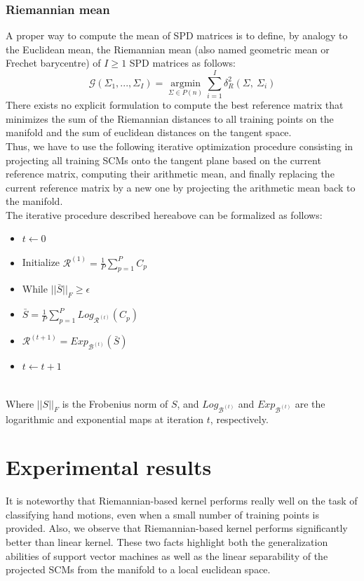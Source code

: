 \documentclass[a4paper,11pt]{report}
\begin{document}
\subsection{Riemannian mean}
A proper way to compute the mean of SPD matrices is to define, by analogy to the Euclidean mean, the Riemannian mean (also named geometric mean or Frechet barycentre) of $I \geq 1$ SPD matrices as follows:
$$\mathcal{G}\left(\Sigma_1, ..., \Sigma_I \right) = \mathop{\mathrm{argmin}}\limits_{\Sigma \in P(n)} \sum_{i=1}^I \delta_R^2 \left( \Sigma,\ \Sigma_i \right) $$
There exists no explicit formulation to compute the best reference matrix that minimizes the sum of the Riemannian distances to all training points on the manifold and the sum of euclidean distances on the tangent space.\\
Thus, we have to use the following iterative optimization procedure consisting in projecting all training SCMs onto the tangent plane based on the current reference matrix, computing their arithmetic mean, and finally replacing the current reference matrix by a new one by projecting the arithmetic mean back to the manifold.\\
The iterative procedure described hereabove can be formalized as follows:
\begin{itemize}
\item $t \leftarrow 0$
\item Initialize $\mathcal{R}^{(1)} = \frac{1}{P} \sum\limits_{p=1}^{P} C_p$
\item While $||\bar{S}||_F \ge \epsilon$
\item $\bar{S} = \frac{1}{P} \sum\limits_{p=1}^{P} Log_{\mathcal{R}^{(t)}} (C_p)$
\item $\mathcal{R}^{(t+1)} = Exp_{\mathcal{B}^{(t)}} (\bar{S})$
\item $t \leftarrow t + 1$
\end{itemize}\ \\
Where $||S||_F$ is the Frobenius norm of $S$, and $Log_{\mathcal{B}^{(t)}}$ and $Exp_{\mathcal{B}^{(t)}}$
are the logarithmic and exponential maps at iteration $t$, respectively.

\chapter{Experimental results}

It is noteworthy that Riemannian-based kernel performs really well on the task of classifying hand
motions, even when a small number of training points is provided. 
Also, we observe that Riemannian-based kernel performs significantly better than linear kernel.
These two facts highlight both the generalization abilities of support vector machines as well as the linear separability
of the projected SCMs from the manifold to a local euclidean space.
\end{document}

